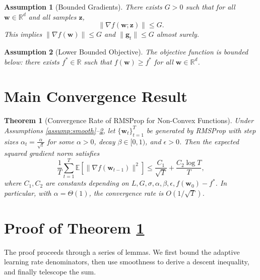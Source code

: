 \documentclass{article}
\newcommand{\E}{\mathbb{E}}
\newcommand{\R}{\mathbb{R}}
\newcommand{\norm}[1]{\|#1\|}
\newcommand{\grad}{\nabla}
\newcommand{\vect}[1]{\bm{#1}}
\newtheorem{assumption}{Assumption}
\newtheorem{theorem}{Theorem}
\begin{document}
\begin{assumption}[Bounded Gradients] \label{assump:bounded_grad}
There exists \(G > 0\) such that for all \(\vect{w} \in \R^d\) and all samples \(\vect{z}\),
\[
\norm{\grad f(\vect{w}; \vect{z})} \le G.
\]
This implies \(\norm{\grad f(\vect{w})} \le G\) and \(\norm{\vect{g}_t} \le G\) almost surely.
\end{assumption}

\begin{assumption}[Lower Bounded Objective] \label{assump:lower_bound}
The objective function is bounded below: there exists \(f^* \in \R\) such that \(f(\vect{w}) \ge f^*\) for all \(\vect{w} \in \R^d\).
\end{assumption}


\section{Main Convergence Result}

\begin{theorem}[Convergence Rate of RMSProp for Non-Convex Functions] \label{thm:main}
Under Assumptions \ref{assump:smooth}--\ref{assump:lower_bound}, let \(\{\vect{w}_t\}_{t=1}^T\) be generated by RMSProp with step sizes \(\alpha_t = \frac{\alpha}{\sqrt{t}}\) for some \(\alpha > 0\), decay \(\beta \in [0,1)\), and \(\epsilon > 0\). Then the expected squared gradient norm satisfies
\[
\frac{1}{T} \sum_{t=1}^T \E \left[ \norm{\grad f(\vect{w}_{t-1})}^2 \right] \le \frac{C_1}{\sqrt{T}} + \frac{C_2 \log T}{T},
\]
where \(C_1, C_2\) are constants depending on \(L, G, \sigma, \alpha, \beta, \epsilon, f(\vect{w}_0) - f^*\). In particular, with \(\alpha = \Theta(1)\), the convergence rate is \(O(1/\sqrt{T})\).
\end{theorem}


\section{Proof of Theorem \ref{thm:main}}

The proof proceeds through a series of lemmas. We first bound the adaptive learning rate denominators, then use smoothness to derive a descent inequality, and finally telescope the sum.
\end{document}
